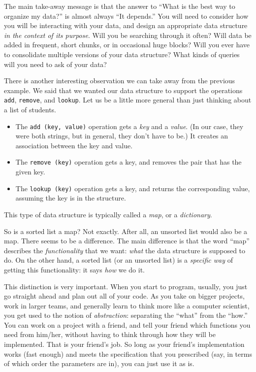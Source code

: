 The main take-away message is that the answer to ``What is the best
way to organize my data?'' is almost always ``It depends.'' 
You will need to consider how you will be interacting with your data,
and design an appropriate data structure \emph{in the context of its purpose}. 
Will you be searching through it often?
Will data be added in frequent, short chunks, or in occasional huge blocks?
Will you ever have to consolidate multiple versions of your data structure?
What kinds of queries will you need to ask of your data?

\medskip

There is another interesting observation we can take away from the previous
example. We said that we wanted our data structure to support
the operations \texttt{add}, \texttt{remove}, and \texttt{lookup}.
Let us be a little more general than just thinking about a list of students.
\begin{itemize}
\item The \texttt{add (key, value)} operation gets a \emph{key} and a
  \emph{value}. (In our case, they were both strings, but in general,
  they don't have to be.)
  It creates an association between the key and value.
\item The \texttt{remove (key)} operation gets a key, and removes the
  pair that has the given key.
\item The \texttt{lookup (key)} operation gets a key, and returns the
  corresponding value, assuming the key is in the structure.
\end{itemize}
This type of data structure is typically called a \emph{map},
or a \emph{dictionary}.

So is a sorted list a map? Not exactly.
After all, an unsorted list would also be a map.
There seems to be a difference.
The main difference is that the word ``map'' describes the
\emph{functionality} that we want:
\emph{what} the data structure is supposed to do.
On the other hand, a sorted list (or an unsorted list) is a
\emph{specific way} of getting this functionality:
it says \emph{how} we do it. 

This distinction is very important. When you start to program,
usually, you just go straight ahead and plan out all of your code.
As you take on bigger projects, work in larger teams, and generally
learn to think more like a computer scientist, you get used to the 
notion of \emph{abstraction}: separating the ``what'' from the ``how.''
You can work on a project with a friend, and tell your friend
which functions you need from him/her, without having to think through
how they will be implemented. That is your friend's job.
So long as your friend's implementation works (fast enough) and meets
the specification that you prescribed (say, in terms of which order
the parameters are in), you can just use it as is.

